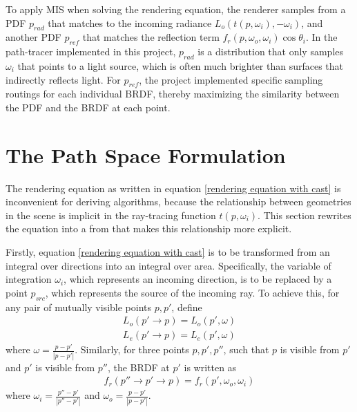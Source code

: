To apply MIS when solving the rendering equation, the renderer samples from a PDF $p_{rad}$ that matches to the incoming radiance $L_o(t(p,\omega_i),-\omega_i)$, and another PDF $p_{ref}$ that matches the reflection term $f_r(p,\omega_o,\omega_i)\cos\theta_i$. In the path-tracer implemented in this project, $p_{rad}$ is a distribution that only samples $\omega_i$ that points to a light source, which is often much brighter than surfaces that indirectly reflects light. For $p_{ref}$, the project implemented specific sampling routings for each individual BRDF, thereby maximizing the similarity between the PDF and the BRDF at each point.


\section{The Path Space Formulation}
The rendering equation as written in equation \ref{rendering equation with cast} is inconvenient for deriving algorithms, because the relationship between geometries in the scene is implicit in the ray-tracing function $t(p,\omega_i)$. This section rewrites the equation into a from that makes this relationship more explicit.

Firstly, equation \ref{rendering equation with cast} is to be transformed from an integral over directions into an integral over area. Specifically, the variable of integration $\omega_i$, which represents an incoming direction, is to be replaced by a point $p_{src}$, which represents the source of the incoming ray. To achieve this, for any pair of mutually visible points $p,p'$, define 
\begin{align*}
    L_o(p'\to p) = L_o(p',\omega)\\
    L_e(p'\to p) = L_e(p',\omega)
\end{align*}
where $\omega = \frac{p-p'}{|p-p'|}$. Similarly, for three points $p,p',p''$, such that $p$ is visible from $p'$ and $p'$ is visible from $p''$, the BRDF at $p'$ is written as
\begin{align*}
    f_r(p''\to p'\to p) = f_r(p',\omega_o,\omega_i)
\end{align*} 
where $\omega_i = \frac{p''-p'}{|p''-p'|}$ and $\omega_o = \frac{p-p'}{|p-p'|}$.

